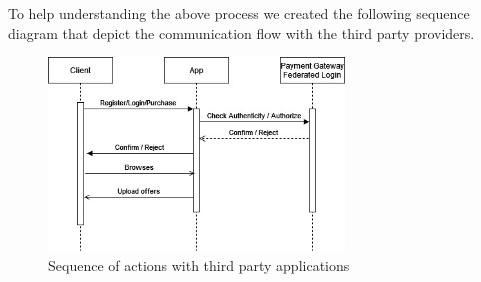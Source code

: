 To help understanding the above process we created the following \gls{sequence diagram} that depict the communication flow 
with the third party providers. 

\begin{figure}[H]
    \centering
    \includegraphics[width=0.7\textwidth]{assets/sequence_login_payment.jpg}
    \caption{Sequence of actions with third party applications}
    \label{fig:sequence_login_payment}
\end{figure}



